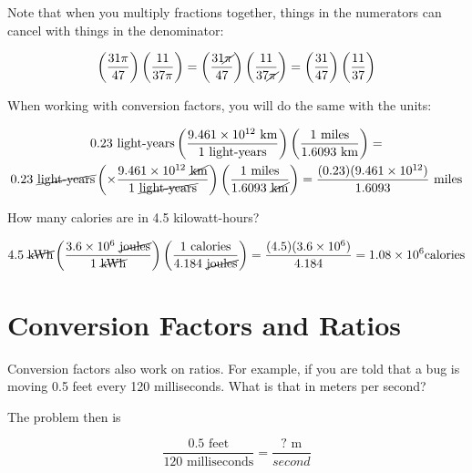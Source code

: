 Note that when you multiply fractions together, things in the numerators can cancel with things in the denominator:

$$\left( \frac{31\pi}{47} \right) \left( \frac{11}{37\pi}\right) = \left(\frac{31\cancel{\pi}}{47}\right) \left( \frac{11}{37\cancel{\pi}}\right) = \left(\frac{31}{47} \right) \left( \frac{11}{37} \right)$$

When working with conversion factors, you will do the same with the units:

\begin{multline*}
  0.23 \text{ light-years} \left( \frac{9.461 \times 10^{12} \text{ km}}{1 \text{ light-years}} \right) \left( \frac{1 \text{ miles}}{1.6093 \text{ km}} \right) = \\
  0.23 \text{ \cancel{light-years}} \left( \times \frac{9.461 \times 10^{12} \text{ \cancel{km}}}{1 \text{ \cancel{light-years}}} \right) \left( \frac{1 \text{ miles}}{1.6093 \text{ \cancel{km}}}\right) = \frac{(0.23)(9.461 \times 10^{12})}{1.6093} \text{ miles}$$
\end{multline*}

\begin{Exercise}[title={Simple Conversion Factors}, label=simple_conversion_factors]

  How many calories are in 4.5 kilowatt-hours?
  
\end{Exercise}
\begin{Answer}[ref=simple_conversion_factors]

  $$4.5 \text{ \cancel{kWh}} \left( \frac{3.6 \times 10^{6} \text{ \cancel{joules}}}{1 \text{ \cancel{kWh}}} \right) \left( \frac{1 \text{ calories}}{4.184 \text{ \cancel{joules}}}\right) = \frac{(4.5)(3.6 \times 10^6)}{4.184} = 1.08 \times 10^6 \text {calories}$$
  
\end{Answer}

\section{Conversion Factors and Ratios}

Conversion factors also work on ratios.  For example, if you are told
that a bug is moving 0.5 feet every 120 milliseconds. What is that in
meters per second?

The problem then is

$$\frac{0.5 \text{ feet}}{120 \text{ milliseconds}} = \frac{\text{? m}}{second}$$

